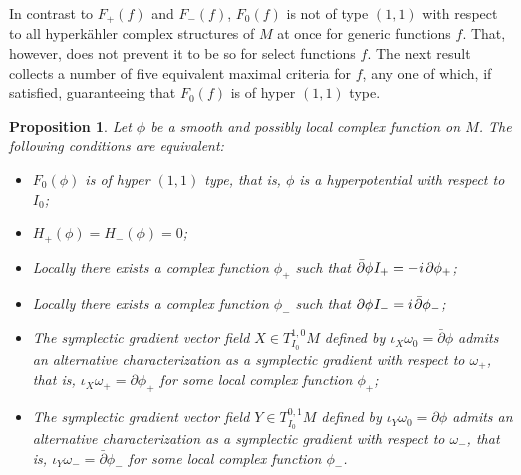 \documentclass[11pt]{amsart}
\newtheorem{proposition}[theorem]{Proposition}
\theoremstyle{remark}
\theoremstyle{remark}
\theoremstyle{definition}
\theoremstyle{definition}
\theoremstyle{definition}
\newcommand{\0}{{\scriptstyle 0'}} %
\newcommand{\1}{{\scriptstyle 1'}}
\newcommand{\pt}{\hspace{1pt}} %
\newcommand{\hp}{\hspace{0.5pt}} %
\begin{document}
In contrast to $F_+(f)$ and $F_-(f)$, $F_0(f)$ is not of type $(1,1)$ with respect to all hyperk\"ahler complex structures of $M$ at once for generic functions $f$. That, however, does not prevent it to be so for select functions $f$. The next result collects a number of five equivalent maximal criteria for $f$, any one of which, if satisfied, guaranteeing that $F_0(f)$ is of hyper $(1,1)$ type. 

\begin{proposition} \label{criterion_2}
Let $\phi$ be a smooth and possibly local complex function on $M$. The following conditions are equivalent:
\begin{itemize}
\setlength{\itemsep}{4pt}

\item[1.] $F_0(\phi)$ is of hyper $(1,1)$ type,  that is, $\phi$ is a hyperpotential with respect to $I_0$;

\item[2.] $H_+(\phi) = H_-(\phi) = 0$;

\item[3.] Locally there exists a complex function $\phi_+$ such that $\bar{\partial}\phi \hp I_+ = - \hp i\pt \partial \phi_+$;

\item[4.] Locally there exists a complex function $\phi_-$ such that $\partial\phi \hp I_- =  i\pt \bar{\partial} \phi_-$;

\item[5.] The symplectic gradient vector field $X \in T^{1,0}_{\scriptscriptstyle I_0}M$ defined by $\iota_{X} \omega_0 = \bar{\partial} \phi$ admits an alternative characterization as a symplectic gradient with respect to $\omega_+$, that is, $\iota_{X} \omega_+ = \partial \phi_+$ for some local complex function $\phi_+$;

\item[6.] The symplectic gradient vector field $Y \in T^{0,1}_{\scriptscriptstyle I_0}M$ defined by $\iota_{Y} \omega_0 = \partial \phi$ admits an alternative characterization as a symplectic gradient with respect to $\omega_-$, that is, $\iota_{Y} \omega_- = \bar{\partial} \phi_-$ for some local complex function $\phi_-$.

\end{itemize}
\end{proposition}
\end{document}
